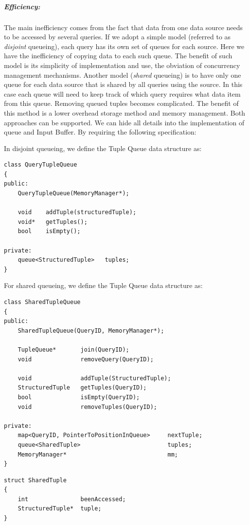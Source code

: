 \documentclass[14pt]{article}
\begin{document}
\subparagraph{Efficiency:} The main inefficiency comes from the fact that data
from one data source needs to be accessed by several queries. If we adopt a
simple model (referred to as \textit{disjoint} queueing), each query has its own
set of queues for each source. Here we have the inefficiency of copying data to
each such queue. The benefit of such model is its simplicity of implementation
and use, the obviation of concurrency management mechanisms. Another model
(\textit{shared} queueing) is to have only one queue for each data source that
is shared by all queries using the source. In this case each queue will need to
keep track of which query requires what data item from this queue. Removing
queued tuples becomes complicated. The benefit of this method is a lower
overhead storage method and memory management. Both approaches can be
supported. We can hide all details into the implementation of queue and Input
Buffer. By requiring the following specification:

\noindent In disjoint queueing, we define the Tuple Queue data structure as:
\begin{Verbatim}
class QueryTupleQueue
{
public:
    QueryTupleQueue(MemoryManager*);
	
    void    addTuple(structuredTuple);
    void*   getTuples();
    bool    isEmpty();

private:
    queue<StructuredTuple>   tuples;
}
\end{Verbatim}

\noindent For shared queueing, we define the Tuple Queue data structure as:
\begin{Verbatim}
class SharedTupleQueue
{
public:
    SharedTupleQueue(QueryID, MemoryManager*);

    TupleQueue*       join(QueryID);
    void              removeQuery(QueryID);

    void              addTuple(StructuredTuple);
    StructuredTuple   getTuples(QueryID);
    bool              isEmpty(QueryID);
    void              removeTuples(QueryID);

private:
    map<QueryID, PointerToPositionInQueue>     nextTuple;
    queue<SharedTuple>                         tuples;
    MemoryManager*                             mm;
}
\end{Verbatim}

\begin{Verbatim}
struct SharedTuple
{
    int               beenAccessed;
    StructuredTuple*  tuple;
}
\end{Verbatim}
\end{document}
